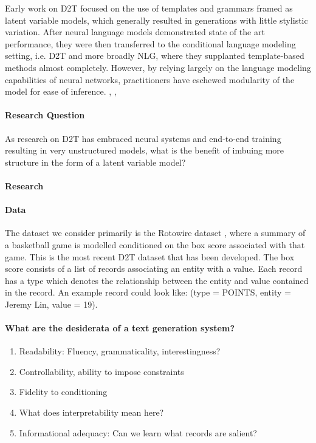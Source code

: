 \documentclass[11pt]{article}
\begin{document}
Early work on D2T focused on the use of templates and grammars framed as latent variable models, 
which generally resulted in generations with little stylistic variation.
After neural language models demonstrated state of the art performance,
they were then transferred to the conditional language modeling setting,
i.e. D2T and more broadly NLG,
where they supplanted template-based methods almost completely.
However, by relying largely on the language modeling capabilities of neural networks,
practitioners have eschewed modularity of the model for ease of inference.
\citep{angeli2010d2t}, \citep{liang2009semalign}, \citep{sauper2009wiki}

\paragraph{Research Question}
As research on D2T has embraced neural systems and end-to-end training resulting in very unstructured models,
what is the benefit of imbuing more structure in the form of a latent variable model?

\paragraph{Research}

\paragraph{Data}
The dataset we consider primarily is the Rotowire dataset \citep{wiseman2017d2t},
where a summary of a basketball game is modelled conditioned on the box score associated with that game.
This is the most recent D2T dataset that has been developed.
The box score consists of a list of records associating an entity with a value.
Each record has a type which denotes the relationship between the entity and value contained in the record.
An example record could look like: (type = POINTS, entity = Jeremy Lin, value = 19).

\paragraph{What are the desiderata of a text generation system?}
\begin{enumerate}
\item Readability: Fluency, grammaticality, interestingness?
\item Controllability, ability to impose constraints
\item Fidelity to conditioning
\item What does interpretability mean here?
\item Informational adequacy: Can we learn what records are salient?
\end{enumerate}
\end{document}
